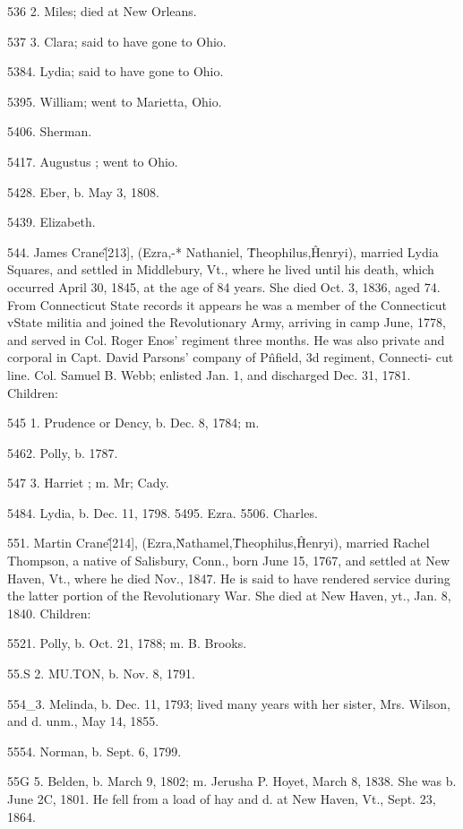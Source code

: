\documentclass{book}
\begin{document}
536  2. Miles; died at New Orleans. 

537  3. Clara; said to have gone to Ohio. 

5384. Lydia; said to have gone to Ohio. 

5395. William; went to Marietta, Ohio. 

5406. Sherman. 

5417. Augustus ; went to Ohio. 

5428. Eber, b. May 3, 1808. 

5439. Elizabeth. 

544. James Crane\^ [213], (Ezra,-* Nathaniel, \^ Theophilus,\^ 
Henryi), married Lydia Squares, and settled in Middlebury, Vt., 
where he lived until his death, which occurred April 30, 1845, at 
the age of 84 years. She died Oct. 3, 1836, aged 74. From 
Connecticut State records it appears he was a member of the 
Connecticut vState militia and joined the Revolutionary Army, 
arriving in camp June, 1778, and served in Col. Roger Enos' 
regiment three months. He was also private and corporal in 
Capt. David Parsons' company of P\^nfield, 3d regiment, Connecti- 
cut line. Col. Samuel B. Webb; enlisted Jan. 1, and discharged 
Dec. 31, 1781. Children: 

545  1. Prudence or Dency, b. Dec. 8, 1784; m. 

5462. Polly, b. 1787. 

547  3. Harriet ; m. Mr; Cady. 




5484. Lydia, b. Dec. 11, 1798. 
5495. Ezra. 
5506. Charles. 

551. Martin Crane\^ [214], (Ezra,\^ Nathamel,\^ Theophilus,\^ 
Henryi), married Rachel Thompson, a native of Salisbury, Conn., 
born June 15, 1767, and settled at New Haven, Vt., where he 
died Nov., 1847. He is said to have rendered service during the 
latter portion of the Revolutionary War. She died at New 
Haven, yt., Jan. 8, 1840. Children: 

5521. Polly, b. Oct. 21, 1788; m. B. Brooks. 

55.S  2. MU.TON, b. Nov. 8, 1791. 

554\_3. Melinda, b. Dec. 11, 1793; lived many years with her sister, 
Mrs. Wilson, and d. unm., May 14, 1855. 

5554. Norman, b. Sept. 6, 1799. 

55G 5. Belden, b. March 9, 1802; m. Jerusha P. Hoyet, March 8, 
1838. She was b. June 2C, 1801. He fell from a load of 
hay and d. at New Haven, Vt., Sept. 23, 1864. 
\end{document}
